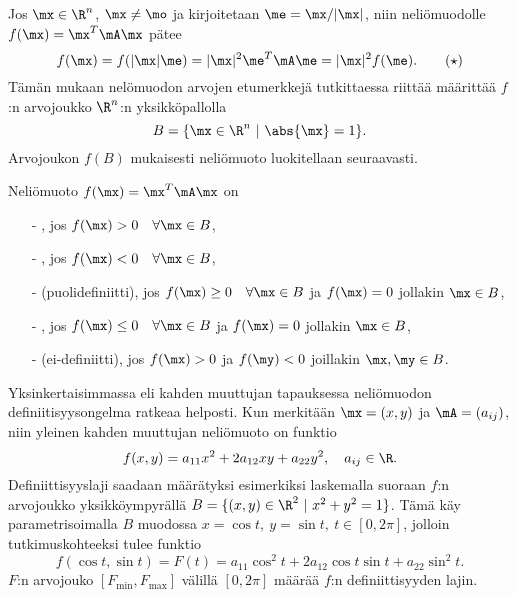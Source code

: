 Jos $\mx\in\R^n$, $\mx\neq\mo$ ja kirjoitetaan $\me=\mx/|\mx|$, niin neliömuodolle
$f(\mx)=\mx^T\mA\mx$ pätee
\begin{equation} \label{neliömuodon skaalaus}
f(\mx)=f(|\mx|\me)=|\mx|^2\me^T\mA\me=|\mx|^2f(\me). \tag{$\star$}
\end{equation}
Tämän mukaan nelömuodon arvojen etumerkkejä tutkittaessa riittää määrittää $f$:n arvojoukko
$\R^n$:n yksikköpallolla
\[
B=\{\mx\in\R^n \ | \ \abs{\mx}=1\}.
\]
Arvojoukon $f(B)$ mukaisesti neliömuoto luokitellaan seuraavasti.
\begin{Def} \label{neliömuodon luokittelu} 
Neliömuoto $f(\mx)=\mx^T\mA\mx$ on
\begin{itemize}
\item[-] , jos $f(\mx)>0 \quad \forall \mx\in B$,
\item[-] , jos $f(\mx)<0 \quad \forall \mx\in B$,
\item[-]  (puolidefiniitti), jos 
         $f(\mx)\geq 0 \quad \forall \mx\in B$ ja $f(\mx)=0$ jollakin $\mx\in B$,
\item[-] , jos $f(\mx)\leq 0 \quad \forall \mx\in B$ ja
         $f(\mx)=0$ jollakin $\mx\in B$,
\item[-]  (ei-definiitti), jos $f(\mx)> 0$ ja $f(\my)<0$ joillakin 
         $\mx,\my\in B$.
\end{itemize}\end{Def} 
Yksinkertaisimmassa eli kahden muuttujan tapauksessa neliömuodon definiitisyysongelma
ratkeaa helposti. Kun merkitään $\mx=(x,y)$ ja $\mA=(a_{ij})$, niin yleinen kahden muuttujan
neliömuoto on funktio
\[
f(x,y)=a_{11}x^2+2a_{12}xy+a_{22}y^2,\quad a_{ij}\in\R.
\]
Definiittisyyslaji saadaan määrätyksi esimerkiksi laskemalla suoraan $f$:n arvojoukko 
yksikköympyrällä $B=\{(x,y)\in\R^2 \ | \ x^2+y^2=1\}$. Tämä käy parametrisoimalla $B$ muodossa
$x=\cos t,\ y=\sin t,\ t\in [0,2\pi]$, jolloin tutkimuskohteeksi tulee funktio
\[
f(\cos t,\sin t)=F(t)=a_{11}\cos^2 t +2a_{12}\cos t\sin t+a_{22}\sin^2 t.
\]
$F$:n arvojouko $[F_{\text{min}},F_{\text{max}}]$ välillä $[0,2\pi]$ määrää $f$:n definiittisyyden
lajin.


